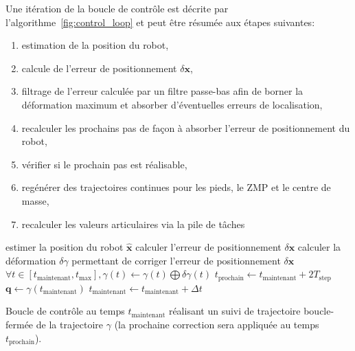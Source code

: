 Une itération de la boucle de contrôle est décrite par
l'algorithme \ref{fig:control_loop} et peut être résumée aux étapes
suivantes:

\begin{enumerate}
\item estimation de la position du robot,
\item calcule de l'erreur de positionnement \mbox{$\delta \mathbf{x}$},
\item filtrage de l'erreur calculée par un filtre passe-bas afin de
  borner la déformation maximum et absorber d'éventuelles erreurs de
  localisation,
\item recalculer les prochains pas de façon à absorber l'erreur de
  positionnement du robot,
\item vérifier si le prochain pas est réalisable,
\item regénérer des trajectoires continues pour les pieds, le ZMP et le centre de masse,
\item recalculer les valeurs articulaires via la pile de tâches
\end{enumerate}


\begin{algorithm}
  \begin{algorithmic}
    \STATE estimer la position du robot $\mathbf{\hat{x}}$
    \STATE calculer l'erreur de positionnement $\delta \mathbf{x}$
    \STATE calculer la déformation $\delta \gamma$ permettant de
    corriger l'erreur de positionnement $\delta \mathbf{x}$
    \STATE $\forall t \in [t_{\text{maintenant}}, t_{\text{max}}],
    \gamma(t) \leftarrow \gamma(t) \bigoplus \delta \gamma(t)$
    \STATE $t_{\text{prochain}} \leftarrow t_{\text{maintenant}} + 2 T_{\text{step}}$
    \ENDIF
    \ENDIF
    \STATE $\mathbf{q} \leftarrow \gamma(t_{\text{maintenant}})$
    \STATE $t_{\text{maintenant}} \leftarrow t_{\text{maintenant}} + \Delta t$
  \end{algorithmic}
  \caption{Boucle de contrôle au temps $t_{\text{maintenant}}$ réalisant
    un suivi de trajectoire boucle-fermée de la trajectoire $\gamma$
    (la prochaine correction sera appliquée au temps
    $t_{\text{prochain}}$). \label{fig:control_loop}}
\end{algorithm}

